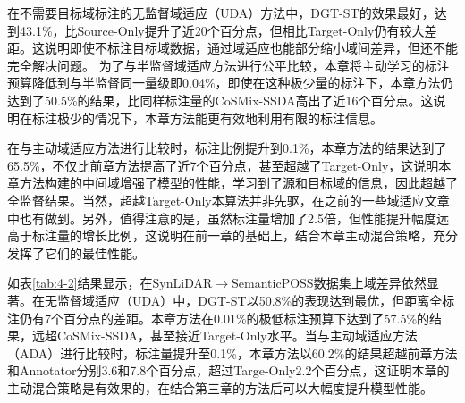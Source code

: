     在不需要目标域标注的无监督域适应（UDA）方法中，DGT-ST的效果最好，达到43.1\%，比Source-Only提升了近20个百分点，但相比Target-Only仍有较大差距。这说明即使不标注目标域数据，通过域适应也能部分缩小域间差异，但还不能完全解决问题。
    为了与半监督域适应方法进行公平比较，本章将主动学习的标注预算降低到与半监督同一量级即0.04\%，即使在这种极少量的标注下，本章方法仍达到了50.5\%的结果，比同样标注量的CoSMix-SSDA高出了近16个百分点。这说明在标注极少的情况下，本章方法能更有效地利用有限的标注信息。

    在与主动域适应方法进行比较时，标注比例提升到0.1\%，本章方法的结果达到了65.5\%，不仅比前章方法提高了近7个百分点，甚至超越了Target-Only，这说明本章方法构建的中间域增强了模型的性能，学习到了源和目标域的信息，因此超越了全监督结果。当然，超越Target-Only本算法并非先驱，在之前的一些域适应文章中也有做到。另外，值得注意的是，虽然标注量增加了2.5倍，但性能提升幅度远高于标注量的增长比例，这说明在前一章的基础上，结合本章主动混合策略，充分发挥了它们的最佳性能。
    
    
    如表\ref{tab:4-2}结果显示，在SynLiDAR$\to$SemanticPOSS数据集上域差异依然显著。在无监督域适应（UDA）中，DGT-ST以50.8\%的表现达到最优，但距离全标注仍有7个百分点的差距。本章方法在0.01\%的极低标注预算下达到了57.5\%的结果，远超CoSMix-SSDA，甚至接近Target-Only水平。当与主动域适应方法（ADA）进行比较时，标注量提升至0.1\%，本章方法以60.2\%的结果超越前章方法和Annotator分别3.6和7.8个百分点，超过Targe-Only2.2个百分点，这证明本章的主动混合策略是有效果的，在结合第三章的方法后可以大幅度提升模型性能。



